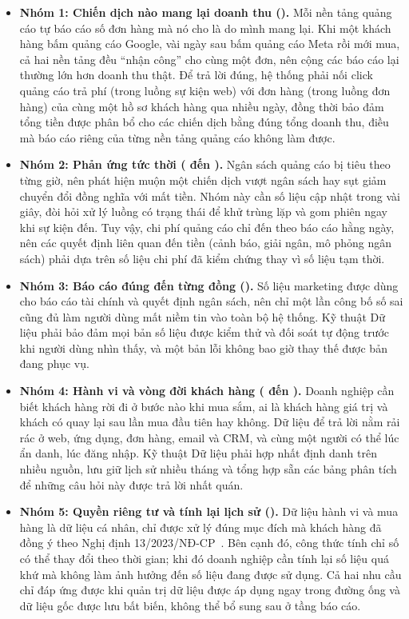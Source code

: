 \begin{itemize}
    \item \textbf{Nhóm 1: Chiến dịch nào mang lại doanh thu ().} Mỗi nền tảng quảng cáo tự báo cáo số đơn hàng mà nó cho là do mình mang lại. Khi một khách hàng bấm quảng cáo Google, vài ngày sau bấm quảng cáo Meta rồi mới mua, cả hai nền tảng đều ``nhận công'' cho cùng một đơn, nên cộng các báo cáo lại thường lớn hơn doanh thu thật. Để trả lời đúng, hệ thống phải nối click quảng cáo trả phí (trong luồng sự kiện web) với đơn hàng (trong luồng đơn hàng) của cùng một hồ sơ khách hàng qua nhiều ngày, đồng thời bảo đảm tổng tiền được phân bổ cho các chiến dịch bằng đúng tổng doanh thu, điều mà báo cáo riêng của từng nền tảng quảng cáo không làm được.
    \item \textbf{Nhóm 2: Phản ứng tức thời ( đến ).} Ngân sách quảng cáo bị tiêu theo từng giờ, nên phát hiện muộn một chiến dịch vượt ngân sách hay sụt giảm chuyển đổi đồng nghĩa với mất tiền. Nhóm này cần số liệu cập nhật trong vài giây, đòi hỏi xử lý luồng có trạng thái để khử trùng lặp và gom phiên ngay khi sự kiện đến. Tuy vậy, chi phí quảng cáo chỉ đến theo báo cáo hằng ngày, nên các quyết định liên quan đến tiền (cảnh báo, giải ngân, mô phỏng ngân sách) phải dựa trên số liệu chi phí đã kiểm chứng thay vì số liệu tạm thời.
    \item \textbf{Nhóm 3: Báo cáo đúng đến từng đồng ().} Số liệu marketing được dùng cho báo cáo tài chính và quyết định ngân sách, nên chỉ một lần công bố số sai cũng đủ làm người dùng mất niềm tin vào toàn bộ hệ thống. Kỹ thuật Dữ liệu phải bảo đảm mọi bản số liệu được kiểm thử và đối soát tự động trước khi người dùng nhìn thấy, và một bản lỗi không bao giờ thay thế được bản đang phục vụ.
    \item \textbf{Nhóm 4: Hành vi và vòng đời khách hàng ( đến ).} Doanh nghiệp cần biết khách hàng rời đi ở bước nào khi mua sắm, ai là khách hàng giá trị và khách có quay lại sau lần mua đầu tiên hay không. Dữ liệu để trả lời nằm rải rác ở web, ứng dụng, đơn hàng, email và CRM, và cùng một người có thể lúc ẩn danh, lúc đăng nhập. Kỹ thuật Dữ liệu phải hợp nhất định danh trên nhiều nguồn, lưu giữ lịch sử nhiều tháng và tổng hợp sẵn các bảng phân tích để những câu hỏi này được trả lời nhất quán.
    \item \textbf{Nhóm 5: Quyền riêng tư và tính lại lịch sử ().} Dữ liệu hành vi và mua hàng là dữ liệu cá nhân, chỉ được xử lý đúng mục đích mà khách hàng đã đồng ý theo Nghị định 13/2023/NĐ-CP~\cite{nd13}. Bên cạnh đó, công thức tính chỉ số có thể thay đổi theo thời gian; khi đó doanh nghiệp cần tính lại số liệu quá khứ mà không làm ảnh hưởng đến số liệu đang được sử dụng. Cả hai nhu cầu chỉ đáp ứng được khi quản trị dữ liệu được áp dụng ngay trong đường ống và dữ liệu gốc được lưu bất biến, không thể bổ sung sau ở tầng báo cáo.
\end{itemize}

